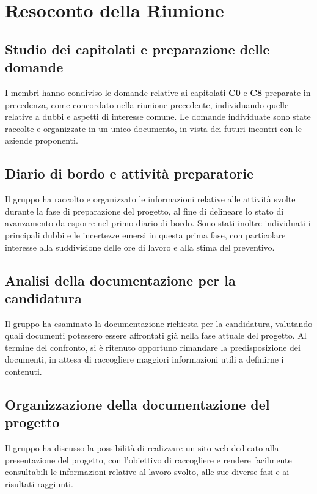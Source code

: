 \documentclass[11pt, a4paper]{article}
\begin{document}
\section{Resoconto della Riunione}

\subsection{Studio dei capitolati e preparazione delle domande}
I membri hanno condiviso le domande relative ai capitolati \textbf{C0} e \textbf{C8} preparate in precedenza, come concordato nella riunione precedente, individuando quelle relative a dubbi e aspetti di interesse comune. Le domande individuate sono state raccolte e organizzate in un unico documento, in vista dei futuri incontri con le aziende proponenti.

\subsection{Diario di bordo e attività preparatorie}
Il gruppo ha raccolto e organizzato le informazioni relative alle attività svolte durante la fase di preparazione del progetto, al fine di delineare lo stato di avanzamento da esporre nel primo diario di bordo. Sono stati inoltre individuati i principali dubbi e le incertezze emersi in questa prima fase, con particolare interesse alla suddivisione delle ore di lavoro e alla stima del preventivo.

\subsection{Analisi della documentazione per la candidatura}
Il gruppo ha esaminato la documentazione richiesta per la candidatura, valutando quali documenti potessero essere affrontati già nella fase attuale del progetto. Al termine del confronto, si è ritenuto opportuno rimandare la predisposizione dei documenti, in attesa di raccogliere maggiori informazioni utili a definirne i contenuti.

\subsection{Organizzazione della documentazione del progetto}
Il gruppo ha discusso la possibilità di realizzare un sito web dedicato alla presentazione del progetto, con l’obiettivo di raccogliere e rendere facilmente consultabili le informazioni relative al lavoro svolto, alle sue diverse fasi e ai risultati raggiunti.
\end{document}
